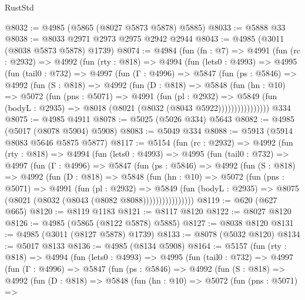\begin{lexlean}{RustStd}
\begin{coremodule}
@8032 := @4985 (@5865 (@8027 @5873 @5878) @5885)
@8033 := @5888 @33
@8038 := @8033 @2971 @2973 @2975 @2942 @2944
@8043 := @4985 (@3011 (@8038 @5873 @5878) @1739)
@8074 := @4984
    (fun (fn : @7) =>
    @4991
      (fun (rc : @2932) =>
      @4992
        (fun (rty : @818) =>
        @4994
          (fun (lets0 : @4993) =>
          @4995
            (fun (tail0 : @732) =>
            @4997
              (fun (Γ : @4996) =>
              @5847
                (fun (ps : @5846) =>
                @4992
                  (fun (S : @818) =>
                  @4992
                    (fun (D : @818) =>
                    @5848
                      (fun (hn : @10) =>
                      @5072
                        (fun (pns : @5071) =>
                        @4991
                          (fun (pl : @2932) =>
                          @5849
                            (fun (bodyL : @2935) => @8018 (@8021 (@8032 (@8043 @5922))))))))))))))))
    @334
@8075 := @4985 @4911
@8078 := @5025 (@5026 @334) @5643
@8082 := @4985 (@5017 (@8078 @5904) @5908)
@8083 := @5049 @334
@8088 := @5913 (@5914 @8083 @5646 @5875 @5877)
@8117 := @5154
    (fun (rc : @2932) =>
    @4992
      (fun (rty : @818) =>
      @4994
        (fun (lets0 : @4993) =>
        @4995
          (fun (tail0 : @732) =>
          @4997
            (fun (Γ : @4996) =>
            @5847
              (fun (ps : @5846) =>
              @4992
                (fun (S : @818) =>
                @4992
                  (fun (D : @818) =>
                  @5848
                    (fun (hn : @10) =>
                    @5072
                      (fun (pns : @5071) =>
                      @4991
                        (fun (pl : @2932) =>
                        @5849
                          (fun (bodyL : @2935) =>
                          @8075 (@8021 (@8032 (@8043 (@8082 @8088))))))))))))))))
@8119 := @620 (@627 @665)
@8120 := @8119 @1183
@8121 := @8117 @8120
@8122 := @8027 @8120
@8126 := @4985 (@5865 (@8122 @5878) @5885)
@8127 := @8038 @8120
@8131 := @4985 (@3011 (@8127 @5878) @1739)
@8133 := @8078 (@5032 @8120)
@8134 := @5017 @8133
@8136 := @4985 (@8134 @5908)
@8164 := @5157
    (fun (rty : @818) =>
    @4994
      (fun (lets0 : @4993) =>
      @4995
        (fun (tail0 : @732) =>
        @4997
          (fun (Γ : @4996) =>
          @5847
            (fun (ps : @5846) =>
            @4992
              (fun (S : @818) =>
              @4992
                (fun (D : @818) =>
                @5848
                  (fun (hn : @10) =>
                  @5072
                    (fun (pns : @5071) =>

\end{coremodule}
\end{lexlean}
